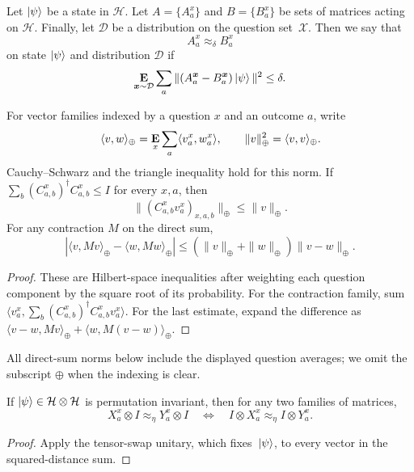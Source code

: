 \documentclass[11pt]{article}
\theoremstyle{definition}
\newcommand{\E}{\mathop{\bf E\/}}
\newcommand{\calD}{\mathcal{D}}
\newcommand{\calH}{\mathcal{H}}
\newcommand{\calX}{\mathcal{X}}
\newcommand{\bx}{{\boldsymbol{x}}}
\begin{document}
\begin{definition}\label{def:approx_delta}
Let $\ket{\psi}$ be a state in $\calH$.
Let $A = \{A^x_a\}$ and $B = \{B^x_a\}$ be
sets of matrices acting on $\calH$.
Finally, let $\calD$ be a distribution on the question set~$\calX$.
Then we say that
  \begin{equation*}
  A^x_a \approx_{\delta}  B^x_a
  \end{equation*}
 on state $\ket{\psi}$ and distribution $\calD$ if
  \begin{equation*}
  \E_{\bx \sim \calD} \sum_{a} \Vert (A^{\bx}_a - B^{\bx}_a) \ket{\psi} \Vert^2 \leq \delta.
    \end{equation*}
\end{definition}

\begin{lemma}\label{lem:direct-sum-estimates}
For vector families indexed by a question $x$ and an outcome $a$, write
\[
 \langle v,w\rangle_\oplus=\E_x\sum_a\langle v_a^x,w_a^x\rangle,
 \qquad \|v\|_\oplus^2=\langle v,v\rangle_\oplus.
\]
Cauchy--Schwarz and the triangle inequality hold for this norm.  If
$\sum_b(C_{a,b}^x)^\dagger C_{a,b}^x\leq I$ for every $x,a$, then
\[
 \|(C_{a,b}^xv_a^x)_{x,a,b}\|_\oplus\leq\|v\|_\oplus.
\]
For any contraction $M$ on the direct sum,
\begin{equation}\label{eq:direct-sum-quadratic-form}
 |\langle v,Mv\rangle_\oplus-\langle w,Mw\rangle_\oplus|
 \leq(\|v\|_\oplus+\|w\|_\oplus)\|v-w\|_\oplus.
\end{equation}
\end{lemma}
\begin{proof}
These are Hilbert-space inequalities after weighting each question
component by the square root of its probability.  For the contraction
family, sum $\langle v_a^x,\sum_b(C_{a,b}^x)^\dagger C_{a,b}^xv_a^x\rangle$.
For the last estimate, expand the difference as
$\langle v-w,Mv\rangle_\oplus+\langle w,M(v-w)\rangle_\oplus$.
\end{proof}

All direct-sum norms below include the displayed question averages;
we omit the subscript $\oplus$ when the indexing is clear.

\begin{proposition}
\label{prop:approx-swap-invariance}
If $\ket\psi\in\calH\otimes\calH$ is permutation invariant, then
for any two families of matrices,
\[
X^x_a\otimes I\approx_\eta Y^x_a\otimes I
\quad\Longleftrightarrow\quad
I\otimes X^x_a\approx_\eta I\otimes Y^x_a.
\]
\end{proposition}
\begin{proof}
Apply the tensor-swap unitary, which fixes~$\ket\psi$, to every
vector in the squared-distance sum.
\end{proof}
\end{document}
